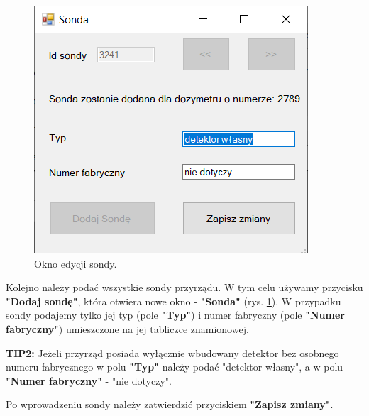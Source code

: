 \begin{figure}[htb]
	\centering
	\includegraphics{obrazki/Biuro/karta/edytuj_sonde.png}
	\caption{Okno edycji sondy.}
	\label{edytujSonde}
\end{figure}

Kolejno należy podać wszystkie sondy przyrządu. W tym celu używamy przycisku \textbf{"Dodaj sondę"}, która otwiera nowe okno - \textbf{"Sonda"} (rys. \ref{edytujSonde}). W przypadku sondy podajemy tylko jej typ (pole \textbf{"Typ"}) i numer fabryczny (pole \textbf{"Numer fabryczny"}) umieszczone na jej tabliczce znamionowej.

\textbf{TIP2:} Jeżeli przyrząd posiada wyłącznie wbudowany detektor bez osobnego numeru fabrycznego w polu \textbf{"Typ"} należy podać "detektor własny", a w polu \textbf{"Numer fabryczny"} - "nie dotyczy". 

Po wprowadzeniu sondy należy zatwierdzić przyciskiem \textbf{"Zapisz zmiany"}. 

